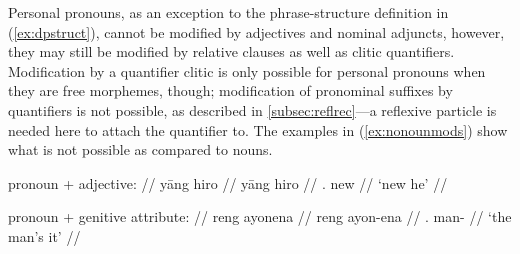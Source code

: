 \begin{morphlex}
\ex\label{ex:perspromorphlex}
\xe
\end{morphlex}

Personal pronouns, as an exception to the phrase-structure definition in 
(\ref{ex:dpstruct}), cannot be modified by adjectives and nominal adjuncts,
however, they may still be modified by relative clauses as well as clitic
quantifiers. Modification by a quantifier clitic is only possible for personal
pronouns when they are free morphemes, though; modification of pronominal
suffixes by quantifiers is not possible, as described in
\autoref{subsec:reflrec}---a reflexive particle is needed here to attach the
quantifier to. The examples in (\ref{ex:nonounmods}) show what is not possible
as compared to nouns.

\pex\label{ex:nonounmods}
\a\ljudge* %
	\begin{minipage}[t]{.5\linewidth}
	\begingl
		\glpreamble pronoun + adjective: //
		\gla yāng hiro //
		\glb yāng hiro //
		\glc \TsgM{}.\Aarg{} new //
		\glft `new he' //
	\endgl
	\end{minipage}

\a\ljudge* %
	\begin{minipage}[t]{.5\linewidth}
	\begingl
		\glpreamble pronoun + genitive attribute: //
		\gla reng ayonena //
		\glb reng ayon-ena //
		\glc \TsgI{}.\Aarg{} man-\Gen{} //
		\glft `the man's it' //
	\endgl
	\end{minipage}

